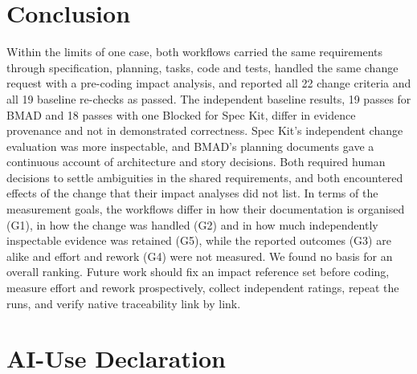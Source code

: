 \documentclass[conference]{IEEEtran}
\begin{document}
\section{Conclusion}\label{conclusion}

Within the limits of one case, both workflows carried the same
requirements through specification, planning, tasks, code and tests,
handled the same change request with a pre-coding impact analysis, and
reported all 22 change criteria and all 19 baseline re-checks as passed.
The independent baseline results, 19 passes for BMAD and 18 passes with
one Blocked for Spec Kit, differ in evidence provenance and not in
demonstrated correctness. Spec Kit's independent change evaluation was
more inspectable, and BMAD's planning documents gave a continuous
account of architecture and story decisions. Both required human
decisions to settle ambiguities in the shared requirements, and both
encountered effects of the change that their impact analyses did not
list. In terms of the measurement goals, the workflows differ in how
their documentation is organised (G1), in how the change was handled
(G2) and in how much independently inspectable evidence was retained
(G5), while the reported outcomes (G3) are alike and effort and rework
(G4) were not measured. We found no basis for an overall ranking. Future
work should fix an impact reference set before coding, measure effort
and rework prospectively, collect independent ratings, repeat the runs,
and verify native traceability link by link.

\section{AI-Use Declaration}\label{ai-use-declaration}
\end{document}
